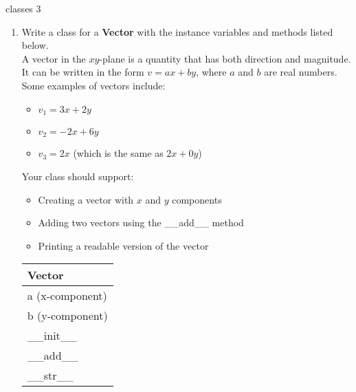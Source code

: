 \documentclass{article}
\begin{document}
\begin{flushright}
classes 3\end{flushright}

\vspace*{-1.5em}
\noindent\makebox[\linewidth]{\rule{\paperwidth}{0.4pt}}


\vspace*{2em}

\begin{enumerate}


	\item
		Write a class for a \textbf{Vector} with the instance variables and methods listed below.\\
		A vector in the $xy$-plane is a quantity that has both direction and magnitude.\\ It can 
		be written in the form $v = ax + by$, where $a$ and $b$ are real numbers.\\[0.5em]
		Some examples of vectors include:
		
		\begin{minipage}[t]{0.65\textwidth}
			\begin{itemize}
				\item $v_1 = 3x + 2y$
				\item $v_2 = -2x + 6y$
				\item $v_3 = 2x$ (which is the same as $2x + 0y$)
			\end{itemize}

			Your class should support:
			\begin{itemize}
				\item Creating a vector with $x$ and $y$ components
				\item Adding two vectors using the \_\_add\_\_ method
				\item Printing a readable version of the vector
			\end{itemize}
		\end{minipage}
		\hfill
		\begin{minipage}[t]{0.32\textwidth}
			\vspace{-1.2em} %
			\begin{flushright}
				\begin{tabular}{|l|}
					\hline
					Vector \\ \hline
					a (x-component) \\
					b (y-component) \\ \hline
					\_\_init\_\_ \\
					\_\_add\_\_ \\
					\_\_str\_\_ \\ \hline
				\end{tabular}
			\end{flushright}
		\end{minipage}


\end{enumerate}
\end{document}
